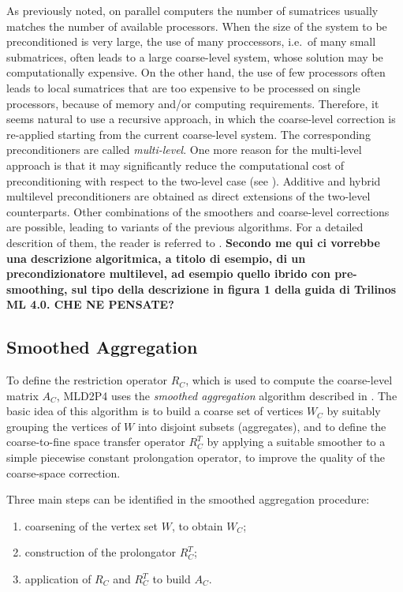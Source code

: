 As previously noted, on parallel computers the number of sumatrices usually matches
the number of available processors. When the size of the system to be preconditioned
is very large, the use of many proccessors, i.e.\ of many small submatrices, often
leads to a large coarse-level system, whose solution may be computationally expensive.
On the other hand, the use of few processors often leads to local sumatrices that
are too expensive to be processed on single processors, because of memory and/or
computing requirements. Therefore, it seems natural to use a recursive approach,
in which the coarse-level correction is re-applied starting from the current
coarse-level system. The corresponding preconditioners are called \emph{multi-level}.
One more reason for the multi-level approach is that it may significantly
reduce the computational cost of preconditioning with respect to the two-level case
(see \cite[Chapter 3]{dd2_96}). Additive and hybrid multilevel preconditioners
are obtained as direct extensions of the two-level counterparts. Other combinations
of the smoothers and coarse-level corrections are possible, leading to variants
of the previous algorithms. For a detailed descrition of them, the reader is
referred to \cite[Chapter 3]{dd2_96}.
\textbf{Secondo me qui ci vorrebbe una descrizione algoritmica, a titolo di esempio,
di un precondizionatore multilevel, ad esempio quello ibrido con pre-smoothing, sul tipo
della descrizione in figura 1 della guida di Trilinos ML 4.0. CHE NE PENSATE?}


\subsection{Smoothed Aggregation\label{sec:aggregation}}

To define the restriction operator $R_C$, which is used to compute
the coarse-level matrix $A_C$, MLD2P4 uses the \emph{smoothed aggregation}
algorithm described in \cite{Brezina_Vanek_,Vanek_Mandel_Brezina_}.
The basic idea of this algorithm is to build a coarse set of vertices
$W_C$ by suitably grouping the vertices of $W$ into disjoint subsets
(aggregates), and to define the coarse-to-fine space transfer operator $R_C^T$ by
applying a suitable smoother to a simple piecewise constant
prolongation operator, to improve the quality of the coarse-space correction.

Three main steps can be identified in the smoothed aggregation procedure:
\begin{enumerate}
	\item coarsening of the vertex set $W$, to obtain $W_C$;
	\item construction of the prolongator $R_C^T$;
	\item application of $R_C$ and $R_C^T$ to build $A_C$.
\end{enumerate}
 
